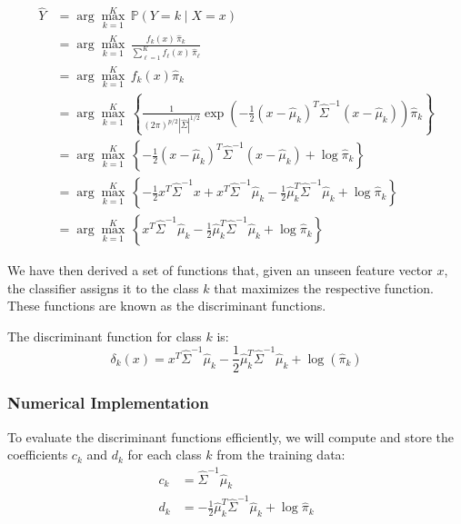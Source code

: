 \begin{align}
\hat{Y} &= \arg\max_{k=1}^K \, \mathbb{P}(Y = k \mid X = x) \nonumber \\
&= \arg\max_{k=1}^K \, \frac{f_k(x) \, \hat{\pi}_k}{\sum_{\ell=1}^K f_\ell(x) \, \hat{\pi}_\ell} \nonumber \\
&= \arg\max_{k=1}^K \, f_k(x) \hat{\pi}_k \nonumber \\
&= \arg\max_{k=1}^K \, \left\{\frac{1}{(2\pi)^{p/2} |\hat{\Sigma}|^{1/2}} \exp\left(-\frac{1}{2}(x - \hat{\mu}_k)^T \hat{\Sigma}^{-1} (x - \hat{\mu}_k)\right) \hat{\pi}_k\right\} \nonumber \\
&= \arg\max_{k=1}^K \, \left\{-\frac{1}{2}(x - \hat{\mu}_k)^T \hat{\Sigma}^{-1} (x - \hat{\mu}_k) + \log \hat{\pi}_k\right\} \label{eq:mahalanobis} \\
&= \arg\max_{k=1}^K \, \left\{-\frac{1}{2}x^T \hat{\Sigma}^{-1} x + x^T \hat{\Sigma}^{-1} \hat{\mu}_k - \frac{1}{2}\hat{\mu}_k^T \hat{\Sigma}^{-1} \hat{\mu}_k + \log \hat{\pi}_k\right\} \nonumber \\
&= \arg\max_{k=1}^K \, \left\{x^T \hat{\Sigma}^{-1} \hat{\mu}_k - \frac{1}{2}\hat{\mu}_k^T \hat{\Sigma}^{-1} \hat{\mu}_k + \log \hat{\pi}_k\right\} \nonumber
\end{align}

We have then derived a set of functions that, given an unseen feature vector $x$, the classifier assigns it to the class $k$ that maximizes the respective function. These functions are known as the discriminant functions.

\begin{definition}
The discriminant function for class $k$ is:
\[
\delta_k(x) = x^T \hat{\Sigma}^{-1} \hat{\mu}_k - \frac{1}{2} \hat{\mu}_k^T \hat{\Sigma}^{-1} \hat{\mu}_k + \log(\hat{\pi}_k)
\]
\end{definition}

\subsubsection{Numerical Implementation}

To evaluate the discriminant functions efficiently, we will compute and store the coefficients $c_k$ and $d_k$ for each class $k$ from the training data:
\begin{align*}
c_k &= \hat{\Sigma}^{-1} \hat{\mu}_k \\
d_k &= -\frac{1}{2} \hat{\mu}_k^T \hat{\Sigma}^{-1} \hat{\mu}_k + \log \hat{\pi}_k
\end{align*}

